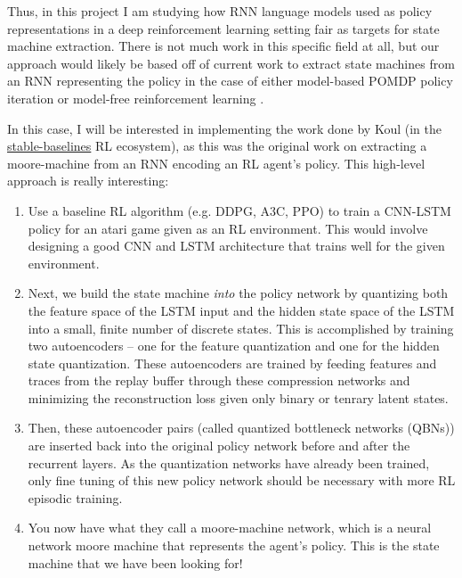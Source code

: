 Thus, in this project I am studying how RNN language models used as policy representations in a deep reinforcement learning setting fair as targets for state machine extraction. There is not much work in this specific field at all, but our approach would likely be based off of current work to extract state machines from an RNN representing the policy in the case of either model-based POMDP policy iteration \cite{Carr2019} \cite{Carr2020} or model-free reinforcement learning \cite{Koul2019}.

In this case, I will be interested in implementing the work done by Koul \cite{Koul2019} (in the \href{https://stable-baselines.readthedocs.io/}{stable-baselines} RL ecosystem), as this was the original work on extracting a moore-machine from an RNN encoding an RL agent's policy. This high-level approach is really interesting:

\begin{enumerate}
    \item Use a baseline RL algorithm (e.g. DDPG, A3C, PPO) to train a CNN-LSTM policy for an atari game given as an RL environment. This would involve designing a good CNN and LSTM architecture that trains well for the given environment.
    
    \item Next, we build the state machine \textit{into} the policy network by quantizing both the feature space of the LSTM input and the hidden state space of the LSTM into a small, finite number of discrete states. This is accomplished by training two autoencoders -- one for the feature quantization and one for the hidden state quantization. These autoencoders are trained by feeding features and traces from the replay buffer through these compression networks and minimizing the reconstruction loss given only binary or tenrary latent states.
    
    \item Then, these autoencoder pairs (called quantized bottleneck networks (QBNs)) are inserted back into the original policy network before and after the recurrent layers. As the quantization networks have already been trained, only fine tuning of this new policy network should be necessary with more RL episodic training.
    
    \item You now have what they call a moore-machine network, which is a neural network moore machine that represents the agent's policy. This is the state machine that we have been looking for!
\end{enumerate}

